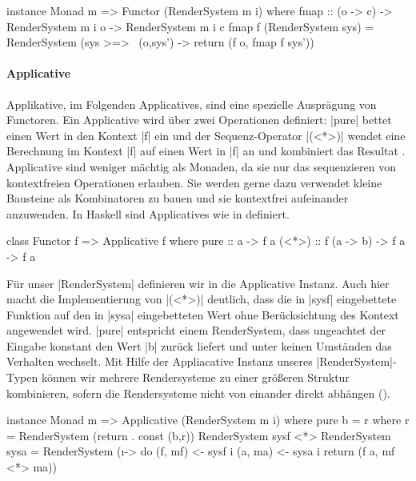 \begin{haskell}[label={lst:rendersystem-functor},caption={Functor Instanz für RenderSystem}]
instance Monad m => Functor (RenderSystem m i) where
  fmap :: (o -> c) -> RenderSystem m i o -> RenderSystem m i c
  fmap f (RenderSystem sys) = RenderSystem (sys >=> \ (o,sys') -> return (f o, fmap f sys'))
\end{haskell}

\paragraph{Applicative}
Applikative, im Folgenden Applicatives, sind eine spezielle Ausprägung von Functoren. Ein Applicative wird über zwei Operationen definiert: |pure| bettet einen Wert in den Kontext |f| ein und der Sequenz-Operator |(<*>)| wendet eine Berechnung im Kontext |f| auf einen Wert in |f| an und kombiniert das Resultat \parencite[Kapitel~2]{Paterson2008}. Applicative sind weniger mächtig als Monaden, da sie nur das sequenzieren von kontextfreien Operationen erlauben. Sie werden gerne dazu verwendet kleine Bausteine als Kombinatoren zu bauen und sie kontextfrei aufeinander anzuwenden. In Haskell sind Applicatives wie in  definiert.

\begin{haskell}[label={lst:class-functor},caption={Applicative Klasse\protect\footnotemark},nolol]
class Functor f => Applicative f where
  pure :: a -> f a
  (<*>) :: f (a -> b) -> f a -> f a
\end{haskell}

Für unser |RenderSystem| definieren wir in  die Applicative Instanz. Auch hier macht die Implementierung von |(<*>)| deutlich, dass die in |sysf| eingebettete Funktion auf den in |sysa| eingebetteten Wert ohne Berücksichtung des Kontext angewendet wird. |pure| entspricht einem RenderSystem, dass ungeachtet der Eingabe konstant den Wert |b| zurück liefert und unter keinen Umständen das Verhalten wechselt. Mit Hilfe der Appliacative Instanz unseres |RenderSystem|-Typen können wir mehrere Rendersysteme zu einer größeren Struktur kombinieren, sofern die Rendersysteme nicht von einander direkt abhängen ().

\begin{haskell}[label={lst:rendersystem-applicative},caption={Applicative Instanz für RenderSystem}]
instance Monad m => Applicative (RenderSystem m i) where
  pure b = r where r = RenderSystem (return . const (b,r))
  RenderSystem sysf <*> RenderSystem sysa = RenderSystem (\i -> do
    (f, mf) <- sysf i
    (a, ma) <- sysa i
    return (f a, mf <*> ma))
\end{haskell}

